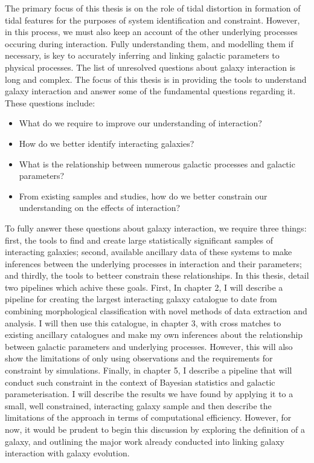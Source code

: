 The primary focus of this thesis is on the role of tidal distortion in formation of tidal features for the purposes of system identification and constraint. However, in this process, we must also keep an account of the other underlying processes occuring during interaction. Fully understanding them, and modelling them if necessary, is key to accurately inferring and linking galactic parameters to physical processes. The list of unresolved questions about galaxy interaction is long and complex. The focus of this thesis is in providing the tools to understand galaxy interaction and answer some of the fundamental questions regarding it. These questions include:

\begin{itemize}
	\item What do we require to improve our understanding of interaction?
	\item How do we better identify interacting galaxies?
	\item What is the relationship between numerous galactic processes and galactic parameters?
	\item From existing samples and studies, how do we better constrain our understanding on the effects of interaction?
\end{itemize}

To fully answer these questions about galaxy interaction, we require three things: first, the tools to find and create large statistically significant samples of interacting galaxies; second, available ancillary data of these systems to make inferences between the underlying processes in interaction and their parameters; and thirdly, the tools to betteer constrain these relationships. In this thesis, detail two pipelines which achive these goals. First,  In chapter 2, I will describe a pipeline for creating the largest interacting galaxy catalogue to date from combining morphological classification with novel methods of data extraction and analysis. I will then use this catalogue, in chapter 3, with cross matches to existing ancillary catalogues and make my own inferences about the relationship between galactic parameters and underlying processes. However, this will also show the limitations of only using observations and the requirements for constraint by simulations. Finally, in chapter 5,  I describe a pipeline that will conduct such constraint in the context of Bayesian statistics and galactic parameterisation. I will describe the results we have found by applying it to a small, well constrained, interacting galaxy sample and then describe the limitations of the approach in terms of computational efficiency. However, for now, it would be prudent to begin this discussion by exploring the definition of  a galaxy, and outlining the major work already conducted into linking galaxy interaction with galaxy evolution.

